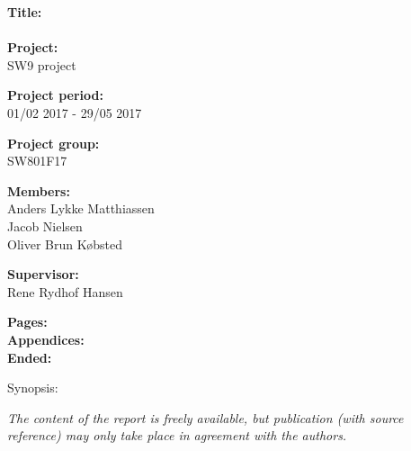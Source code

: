 \begin{minipage}[t]{0.48\textwidth}
\textbf{Title:} \\[5pt]\hspace{2ex}
\\

\textbf{Project:} \\[5pt]\bigskip\hspace{2ex}
SW9 project

\textbf{Project period:} \\[5pt]\bigskip\hspace{2ex}
01/02 2017 - 29/05 2017

\textbf{Project group:} \\[5pt]\bigskip\hspace{2ex}
SW801F17

\textbf{Members:} \\[5pt]\hspace*{2ex}
Anders Lykke Matthiassen \\\hspace*{2ex}
Jacob Nielsen \\\hspace*{2ex}
Oliver Brun Købsted 


\textbf{Supervisor:} \\[5pt]\hspace*{2ex}
Rene Rydhof Hansen

\vspace*{1cm}

\textbf{Pages: } \\
\textbf{Appendices: } \\
\textbf{Ended: }

\end{minipage}
\hfill
\begin{minipage}[t]{0.483\textwidth}
Synopsis: \\[5pt]
\fbox{\parbox{7cm}{\bigskip\bigskip}}
\end{minipage}

\vfill

{\footnotesize\itshape The content of the report is freely available, but publication (with source reference) may only take place in agreement with the authors.}

